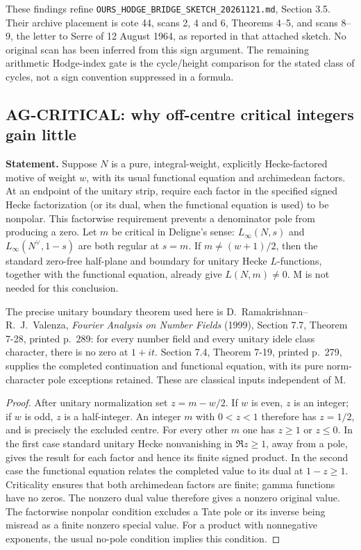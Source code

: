 These findings refine \texttt{OURS\_HODGE\_BRIDGE\_SKETCH\_20261121.md},
Section 3.5. Their archive placement is cote 44, scans 2, 4 and 6,
Theorems 4--5, and scans 8--9, the letter to Serre of 12 August 1964,
as reported in that attached sketch. No original scan has been inferred
from this sign argument. The remaining arithmetic Hodge-index gate is
the cycle/height comparison for the stated class of cycles, not a sign
convention suppressed in a formula.

\subsection{AG-CRITICAL: why off-centre critical integers gain little}
\label{ag:critical}

\textbf{Statement.} Suppose $N$ is a pure, integral-weight, explicitly
Hecke-factored motive of weight $w$, with its usual functional equation
and archimedean factors. At an endpoint of the unitary strip, require each
factor in the specified signed Hecke factorization (or its dual, when the
functional equation is used) to be nonpolar. This factorwise requirement
prevents a denominator pole from producing a zero. Let $m$ be critical in
Deligne's sense: $L_\infty(N,s)$ and $L_\infty(N^\vee,1-s)$
are both regular at $s=m$. If $m\ne(w+1)/2$, then the standard
zero-free half-plane and boundary for unitary Hecke $L$-functions,
together with the functional equation, already give $L(N,m)\ne0$.
M is not needed for this conclusion.

The precise unitary boundary theorem used here is
D.~Ramakrishnan--R.~J.~Valenza, \emph{Fourier Analysis on Number Fields}
(1999), Section 7.7, Theorem 7-28, printed p.~289: for every number
field and every unitary idele class character, there is no zero at
$1+it$. Section 7.4, Theorem 7-19, printed p.~279, supplies the completed
continuation and functional equation, with its pure norm-character pole
exceptions retained. These are classical inputs independent of M.

\begin{proof}
After unitary normalization set $z=m-w/2$. If $w$ is even, $z$ is an
integer; if $w$ is odd, $z$ is a half-integer. An integer $m$ with
$0<z<1$ therefore has $z=1/2$, and is precisely the excluded centre.
For every other $m$ one has $z\ge1$ or $z\le0$. In the first case
standard unitary Hecke nonvanishing in $\Re z\ge1$, away from a pole,
gives the result for each factor and hence its finite signed product.
In the second case the functional equation relates the completed value
to its dual at $1-z\ge1$. Criticality ensures that both archimedean
factors are finite; gamma functions have no zeros. The nonzero dual
value therefore gives a nonzero original value. The factorwise nonpolar
condition excludes a Tate pole or its inverse being misread as a finite
nonzero special value. For a product with nonnegative exponents, the
usual no-pole condition implies this condition.
\end{proof}

